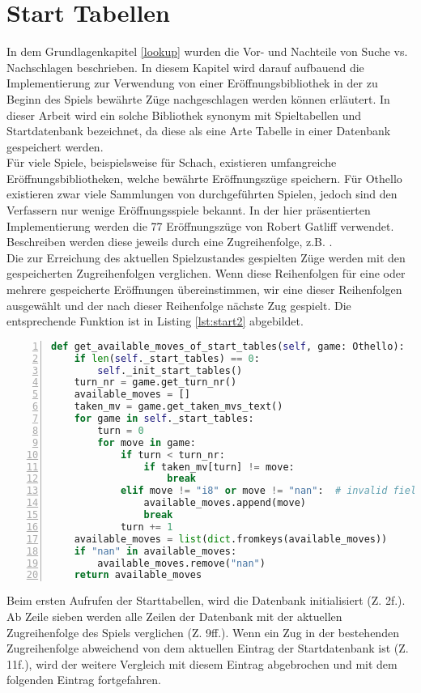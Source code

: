 \section{Start Tabellen}
In dem Grundlagenkapitel \ref{lookup} wurden die Vor- und Nachteile von Suche vs. Nachschlagen beschrieben. In diesem Kapitel wird darauf aufbauend die Implementierung zur Verwendung von einer Eröffnungsbibliothek in der zu Beginn des Spiels bewährte Züge nachgeschlagen werden können erläutert. In dieser Arbeit wird ein solche Bibliothek synonym mit Spieltabellen und Startdatenbank bezeichnet, da diese als eine Arte Tabelle in einer Datenbank gespeichert werden.
\\Für viele Spiele, beispielsweise für Schach, existieren umfangreiche Eröffnungsbibliotheken, welche bewährte Eröffnungszüge speichern. Für Othello existieren zwar viele Sammlungen von durchgeführten Spielen, jedoch sind den Verfassern nur wenige Eröffnungsspiele bekannt. In der hier präsentierten Implementierung werden die 77 Eröffnungszüge von Robert Gatliff \cite{open1} verwendet. Beschreiben werden diese jeweils durch eine Zugreihenfolge, z.B. . 
\\Die zur Erreichung des aktuellen Spielzustandes gespielten Züge werden mit den gespeicherten Zugreihenfolgen verglichen. Wenn diese Reihenfolgen für eine oder mehrere gespeicherte Eröffnungen übereinstimmen, wir eine dieser Reihenfolgen ausgewählt und der nach dieser Reihenfolge nächste Zug gespielt. Die entsprechende Funktion  ist in Listing \ref{lst:start2} abgebildet.
\newpage
\begin{lstlisting}[basicstyle=\footnotesize, caption = {Befüllen der Datenbank 2}, language = python, captionpos = t , numbers=left, label={lst:start2}]
def get_available_moves_of_start_tables(self, game: Othello):
	if len(self._start_tables) == 0:
		self._init_start_tables()
	turn_nr = game.get_turn_nr()
	available_moves = []
	taken_mv = game.get_taken_mvs_text()
	for game in self._start_tables:
		turn = 0
		for move in game:
			if turn < turn_nr:
				if taken_mv[turn] != move:
					break
			elif move != "i8" or move != "nan":  # invalid field
				available_moves.append(move)
				break
			turn += 1
	available_moves = list(dict.fromkeys(available_moves))
	if "nan" in available_moves:
		available_moves.remove("nan")
	return available_moves
\end{lstlisting}
Beim ersten Aufrufen der Starttabellen, wird die Datenbank initialisiert (Z. 2f.). Ab Zeile sieben werden alle Zeilen der Datenbank mit der aktuellen Zugreihenfolge des Spiels verglichen (Z. 9ff.). Wenn ein Zug in der bestehenden Zugreihenfolge abweichend von dem aktuellen Eintrag der Startdatenbank ist (Z. 11f.), wird der weitere Vergleich mit diesem Eintrag abgebrochen und mit dem folgenden Eintrag fortgefahren.
